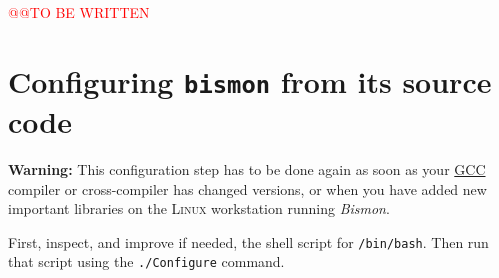 \begin{appendices}
{\textcolor{red}{\large @@TO BE WRITTEN}}

\section{Configuring \texttt{bismon} from its source code}
\label{sec:configure-bismon}

\textbf{\large Warning:} This configuration step has to be done again as soon
as your \href{http://gcc.gnu.org/}{GCC} compiler or cross-compiler has
changed versions, or when you have added new important libraries on
the \textsc{Linux} workstation running \emph{Bismon}.

First, inspect, and improve if needed, the  shell
script for \texttt{/bin/bash}. Then run that script using the
\texttt{./Configure} command.

\end{appendices}

